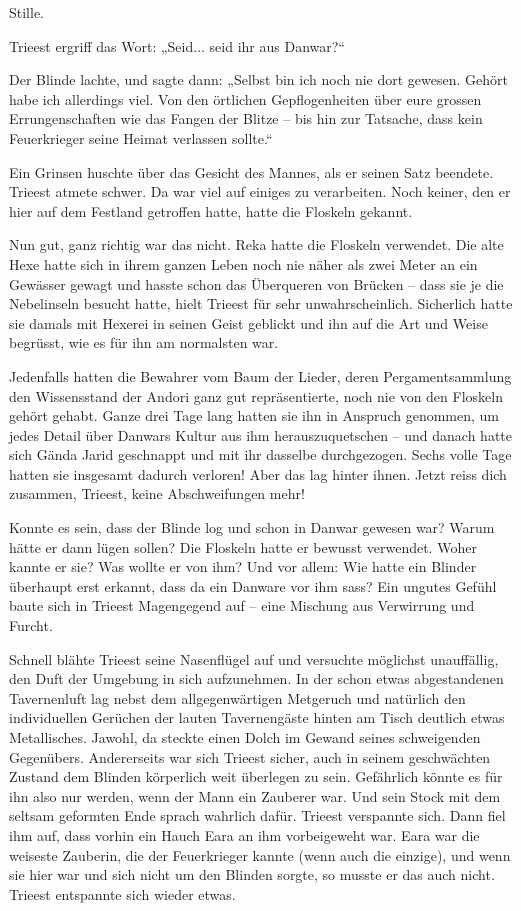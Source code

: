 \documentclass[10pt, a4paper, oneside]{book}
\begin{document}
Stille.

Trieest ergriff das Wort: „Seid... seid ihr aus Danwar?“

Der Blinde lachte, und sagte dann: „Selbst bin ich noch nie dort gewesen. Gehört habe ich allerdings viel. Von den örtlichen Gepflogenheiten über eure grossen Errungenschaften wie das Fangen der Blitze – bis hin zur Tatsache, dass kein Feuerkrieger seine Heimat verlassen sollte.“

Ein Grinsen huschte über das Gesicht des Mannes, als er seinen Satz beendete. Trieest atmete schwer. Da war viel auf einiges zu verarbeiten. Noch keiner, den er hier auf dem Festland getroffen hatte, hatte die Floskeln gekannt.

Nun gut, ganz richtig war das nicht. Reka hatte die Floskeln verwendet. Die alte Hexe hatte sich in ihrem ganzen Leben noch nie näher als zwei Meter an ein Gewässer gewagt und hasste schon das Überqueren von Brücken – dass sie je die Nebelinseln besucht hatte, hielt Trieest für sehr unwahrscheinlich. Sicherlich hatte sie damals mit Hexerei in seinen Geist geblickt und ihn auf die Art und Weise begrüsst, wie es für ihn am normalsten war.

Jedenfalls hatten die Bewahrer vom Baum der Lieder, deren Pergamentsammlung den Wissensstand der Andori ganz gut repräsentierte, noch nie von den Floskeln gehört gehabt. Ganze drei Tage lang hatten sie ihn in Anspruch genommen, um jedes Detail über Danwars Kultur aus ihm herauszuquetschen – und danach hatte sich Gända Jarid geschnappt und mit ihr dasselbe durchgezogen. Sechs volle Tage hatten sie insgesamt dadurch verloren! Aber das lag hinter ihnen. Jetzt reiss dich zusammen, Trieest, keine Abschweifungen mehr!\bigskip



Konnte es sein, dass der Blinde log und schon in Danwar gewesen war? Warum hätte er dann lügen sollen? Die Floskeln hatte er bewusst verwendet. Woher kannte er sie? Was wollte er von ihm? Und vor allem: Wie hatte ein Blinder überhaupt erst erkannt, dass da ein Danware vor ihm sass? Ein ungutes Gefühl baute sich in Trieest Magengegend auf – eine Mischung aus Verwirrung und Furcht.

Schnell blähte Trieest seine Nasenflügel auf und versuchte möglichst unauffällig, den Duft der Umgebung in sich aufzunehmen. In der schon etwas abgestandenen Tavernenluft lag nebst dem allgegenwärtigen Metgeruch und natürlich den individuellen Gerüchen der lauten Tavernengäste hinten am Tisch deutlich etwas Metallisches. Jawohl, da steckte einen Dolch im Gewand seines schweigenden Gegenübers. Andererseits war sich Trieest sicher, auch in seinem geschwächten Zustand dem Blinden körperlich weit überlegen zu sein. Gefährlich könnte es für ihn also nur werden, wenn der Mann ein Zauberer war. Und sein Stock mit dem seltsam geformten Ende sprach wahrlich dafür. Trieest verspannte sich. Dann fiel ihm auf, dass vorhin ein Hauch Eara an ihm vorbeigeweht war. Eara war die weiseste Zauberin, die der Feuerkrieger kannte (wenn auch die einzige), und wenn sie hier war und sich nicht um den Blinden sorgte, so musste er das auch nicht. Trieest entspannte sich wieder etwas.\bigskip
\end{document}
